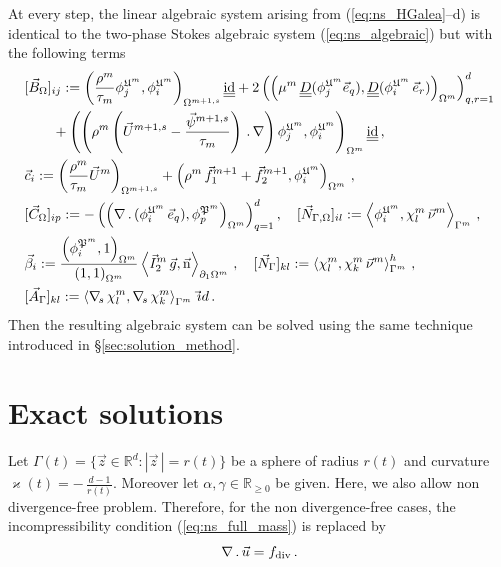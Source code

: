 \documentclass[a4paper,12pt,onecolumn]{article}
\newcommand{\R}{\mathbb R}
\newcommand{\uspacesimpleale}{\mathfrak{U}} %
\newcommand{\pspaceale}{\mathfrak{P}} %
\newcommand{\nabs}{\nabla_{\!s}}
\newcommand{\id}{\rm id}
\newcommand{\Nbulk}{\vec{N}_{\Gamma,\Omega}}
\newcommand{\unitn}{\vec{\rm n}}
\newcommand{\mat}[1]{\underline{\underline{#1}}\rule{0pt}{0pt}}
\begin{document}
At every step, the linear algebraic system arising from (\ref{eq:ns_HGalea}--d)
is identical to the two-phase Stokes algebraic system
(\ref{eq:ns_algebraic}) but with the following terms
\begin{align*}
& [\vec B_\Omega]_{ij} := \left( \frac{\rho^m}{\tau_m}
\phi_j^{\uspacesimpleale^m},
\phi_i^{\uspacesimpleale^m} \right)_{\Omega^{m+1,s}}\mat \id
+ 2\left(\left(\mu^m\,\mat D(\phi_j^{\uspacesimpleale^m} \vec e_q),
\mat D(\phi_i^{\uspacesimpleale^m}\,\vec e_r)\right)_{\Omega^m}
\right)_{q,r=1}^d\\
& \qquad + \left( \left(\rho^m \left(\vec U^{m+1,s} -
\frac{\vec \psi^{m+1,s}}{\tau_m}\right)\,.\,\nabla \right)
\phi_j^{\uspacesimpleale^m},\phi_i^{\uspacesimpleale^m}
\right)_{\Omega^m}\mat \id \,,\\
& \vec c_i := \left( \frac{\rho^m}{\tau_m}\vec U^m \right)_{\Omega^{m+1,s}}
+ \left(\rho^m\,\vec f_1^{m+1}+\vec f_2^{m+1},
\phi_i^{\uspacesimpleale^m}\right)_{\Omega^m}\,,\\
& [\vec C_\Omega]_{ip} := - \left(
\left(\nabla\,.\,(\phi_i^{\uspacesimpleale^m}\,\vec
e_q), \phi_p^{\pspaceale^m} \right)_{\Omega^m} \right)_{q=1}^d,\quad
[\Nbulk]_{il} := \left\langle \phi_i^{\uspacesimpleale^m}, \chi^m_l \,\vec\nu^m
\right\rangle_{\Gamma^m} \,,\\
& \vec \beta_i :=
\frac{\left(\phi_i^{\pspaceale^m},1\right)_{\Omega^m}}{\left(1,1\right)
_{\Omega^m}} \left\langle \vec I_2^m\,\vec
g,\unitn\right\rangle_{\partial_1\Omega^m}\,,\quad
[\vec N_\Gamma]_{kl} := \left\langle \chi^m_l, \chi^m_k\,\vec\nu^m
\right\rangle_{\Gamma^m}^h \,,\\
& [\vec A_\Gamma]_{kl} := \left\langle \nabs\,\chi^m_l, \nabs\,\chi^m_k
\right\rangle_{\Gamma^m} \,\vec\id \,.
\end{align*}
Then the resulting algebraic system can be solved using the same technique
introduced in \S\ref{sec:solution_method}.

\section{Exact solutions}\label{sec:ns_exact_solutions}
Let $\Gamma(t) = \{ \vec z \in \R^d : |\vec z\,| = r(t)\}$ be a sphere of radius
$r(t)$ and curvature $\varkappa(t) = -\,\frac{d-1}{r(t)}$. Moreover let
$\alpha,\gamma\in \R_{\geq 0}$ be given. Here, we also allow
non divergence-free problem. Therefore, for the non divergence-free cases, the
incompressibility condition (\ref{eq:ns_full_mass}) is replaced by
\begin{equation}\label{eq:ns_compressible}
\nabla\,.\,\vec u = f_{\rm{div}}\,.
\end{equation}
\end{document}
